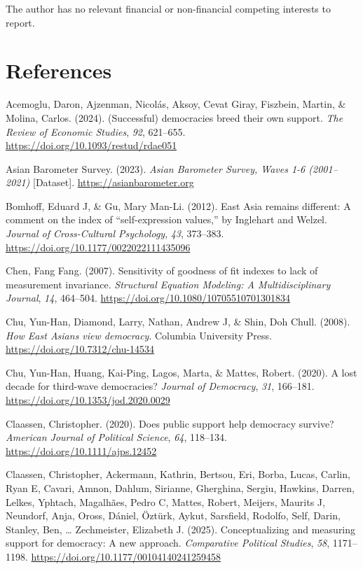 \documentclass[
  12pt,
  12pt,
  letterpaper]{article}
\newlength{\cslhangindent}
\newenvironment{CSLReferences}[2] %
 {\begin{list}{}{%
  \setlength{\itemindent}{0pt}
  \setlength{\leftmargin}{0pt}
  \setlength{\parsep}{0pt}
  \ifodd #1
   \setlength{\leftmargin}{\cslhangindent}
   \setlength{\itemindent}{-1\cslhangindent}
  \fi
  \setlength{\itemsep}{#2\baselineskip}}}
 {\end{list}}
\begin{document}
The author has no relevant financial or non-financial competing
interests to report.

\section*{References}\label{references}

\label{refs}
\begin{CSLReferences}{1}{0}
Acemoglu, Daron, Ajzenman, Nicolás, Aksoy, Cevat Giray, Fiszbein,
Martin, \& Molina, Carlos. (2024). {(Successful) democracies breed their
own support}. \emph{The Review of Economic Studies}, \emph{92},
621--655. \url{https://doi.org/10.1093/restud/rdae051}

Asian Barometer Survey. (2023). \emph{{Asian Barometer Survey, Waves 1-6
(2001--2021)}} {[}Dataset{]}. \url{https://asianbarometer.org}

Bomhoff, Eduard J, \& Gu, Mary Man-Li. (2012). {East Asia remains
different: A comment on the index of {``self-expression values,''} by
Inglehart and Welzel}. \emph{Journal of Cross-Cultural Psychology},
\emph{43}, 373--383. \url{https://doi.org/10.1177/0022022111435096}

Chen, Fang Fang. (2007). {Sensitivity of goodness of fit indexes to lack
of measurement invariance}. \emph{Structural Equation Modeling: A
Multidisciplinary Journal}, \emph{14}, 464--504.
\url{https://doi.org/10.1080/10705510701301834}

Chu, Yun-Han, Diamond, Larry, Nathan, Andrew J, \& Shin, Doh Chull.
(2008). \emph{{How East Asians view democracy}}. Columbia University
Press. \url{https://doi.org/10.7312/chu-14534}

Chu, Yun-Han, Huang, Kai-Ping, Lagos, Marta, \& Mattes, Robert. (2020).
{A lost decade for third-wave democracies?} \emph{Journal of Democracy},
\emph{31}, 166--181. \url{https://doi.org/10.1353/jod.2020.0029}

Claassen, Christopher. (2020). {Does public support help democracy
survive?} \emph{American Journal of Political Science}, \emph{64},
118--134. \url{https://doi.org/10.1111/ajps.12452}

Claassen, Christopher, Ackermann, Kathrin, Bertsou, Eri, Borba, Lucas,
Carlin, Ryan E, Cavari, Amnon, Dahlum, Sirianne, Gherghina, Sergiu,
Hawkins, Darren, Lelkes, Yphtach, Magalhães, Pedro C, Mattes, Robert,
Meijers, Maurits J, Neundorf, Anja, Oross, Dániel, Öztürk, Aykut,
Sarsfield, Rodolfo, Self, Darin, Stanley, Ben, \ldots{} Zechmeister,
Elizabeth J. (2025). {Conceptualizing and measuring support for
democracy: A new approach}. \emph{Comparative Political Studies},
\emph{58}, 1171--1198. \url{https://doi.org/10.1177/00104140241259458}


\end{CSLReferences}
\end{document}
